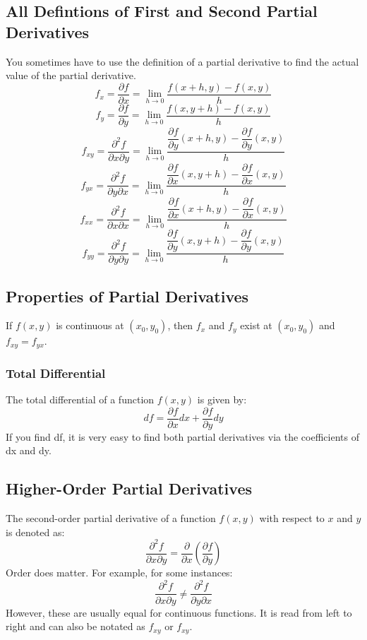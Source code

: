 \documentclass[a4paper,12pt,openany]{book}
\newcommand{\pd}[2]{\dfrac{\partial #1}{\partial #2}}
\newcommand{\pdm}[3]{\dfrac{\partial^2 #1}{\partial #2 \partial #3}}
\begin{document}
\subsection{All Defintions of First and Second Partial Derivatives}
You sometimes have to use the definition of a partial derivative to find the actual value of the partial derivative. 
\begin{equation} \label{Partial Derivative f_x Definition}
    f_x = \pd{f}{x} = \lim_{h \to 0} \dfrac{f(x+h, y) - f(x, y)}{h}
\end{equation}
\begin{equation}\label{Partial Derivative f_y Definition}
    f_y = \pd{f}{y} = \lim_{h \to 0} \dfrac{f(x, y+h) - f(x, y)}{h}
\end{equation}
\begin{equation}\label{Second Partial Derivative f_xx Definition}
    f_{xy} = \pdm{f}{x}{y} = \lim_{h \to 0} \dfrac{\pd{f}{y}(x+h, y) - \pd{f}{y}(x, y)}{h}
\end{equation}
\begin{equation}\label{Second Partial Derivative f_yx Definition}
    f_{yx} = \pdm{f}{y}{x} = \lim_{h \to 0} \dfrac{\pd{f}{x}(x, y+h) - \pd{f}{x}(x, y)}{h}
\end{equation}
\begin{equation}\label{Second Partial Derivative f_xx Definition}
    f_{xx} = \pdm{f}{x}{x} = \lim_{h \to 0} \dfrac{\pd{f}{x}(x+h, y) - \pd{f}{x}(x, y)}{h}
\end{equation}
\begin{equation}\label{Second Partial Derivative f_yy Definition}
    f_{yy} = \pdm{f}{y}{y} = \lim_{h \to 0} \dfrac{\pd{f}{y}(x, y+h) - \pd{f}{y}(x, y)}{h}
\end{equation}

\subsection{Properties of Partial Derivatives}
If $f(x,y)$ is continuous at $(x_0, y_0)$, then $f_x$ and $f_y$ exist at $(x_0, y_0)$ and $f_{xy} = f_{yx}$.

\subsubsection{Total Differential}
The total differential of a function \(f(x, y)\) is given by:
\[
    df = \pd{f}{x}dx + \pd{f}{y}dy
\]
If you find df, it is very easy to find both partial derivatives via the coefficients of dx and dy.
\subsection{Higher-Order Partial Derivatives}
The second-order partial derivative of a function \(f(x, y)\) with respect to \(x\) and \(y\) is denoted as:
\[
    \pdm{f}{x}{y} = \pd{}{x}\left(\pd{f}{y}\right)
\]
Order does matter. For example, for some instances: \[\pdm{f}{x}{y} \neq \pdm{f}{y}{x}\] However, these are usually equal for continuous functions. It is read from left to right and can also be notated as \(f_{xy}\) or \(f_{xy}\).
\pagebreak
\end{document}
